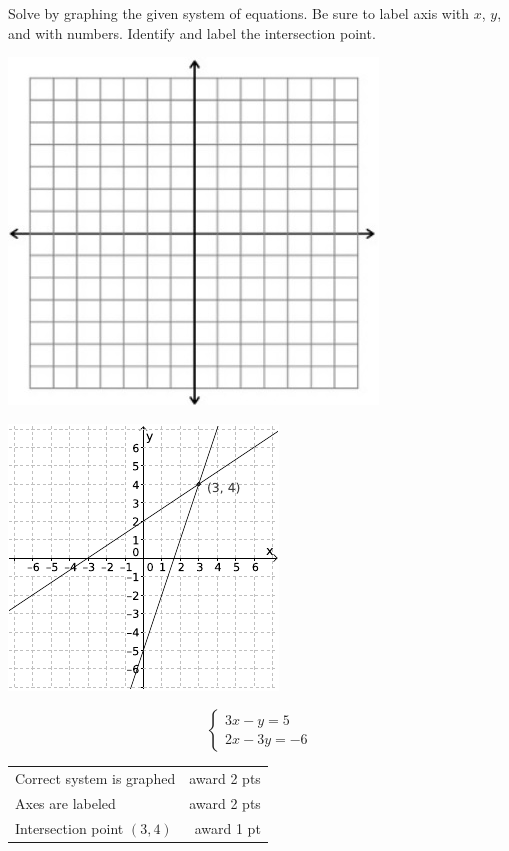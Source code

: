 {
	Solve by graphing the given system of equations. Be sure to label axis with $x$, $y$, and with numbers. Identify and label the intersection point. \begin{onlyproblem}\begin{center}\includegraphics{fig-graphpaper.png}\end{center}\end{onlyproblem} \begin{onlysolution}\begin{center}\includegraphics{fig095-10-d-answer}\end{center}\end{onlysolution}
	$$\begin{cases}3x-y=5\\ 2x-3y=-6\end{cases}$$
}
{
	\begin{tabular}{l r}
	Correct system is graphed & award 2 pts\\
	Axes are labeled & award 2 pts\\
	Intersection point $(3,4)$ & award 1 pt
	\end{tabular}
}

